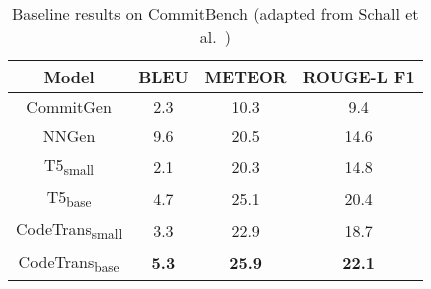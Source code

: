 \begin{table}[]
\centering
\caption{Baseline results on CommitBench (adapted from Schall et al.~\cite{schall2024commitbench})}
\renewcommand{\arraystretch}{1.2}
\label{tab:commit-bench-baseline}
\begin{tabular}{|c|c|c|c|}
\hline
\textbf{Model} & \textbf{BLEU} & \textbf{METEOR} & \textbf{ROUGE-L F1} \\ \hline
CommitGen           & 2.3  & 10.3 & 9.4   \\
NNGen               & 9.6  & 20.5 & 14.6  \\
T5\textsubscript{small}     & 2.1  & 20.3 & 14.8  \\
T5\textsubscript{base}      & 4.7  & 25.1 & 20.4  \\
CodeTrans\textsubscript{small} & 3.3 & 22.9 & 18.7  \\
CodeTrans\textsubscript{base} & \textbf{5.3} & \textbf{25.9} & \textbf{22.1}  \\
\hline
\end{tabular}
\end{table}
